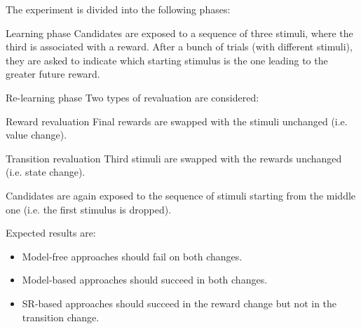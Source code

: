 \begin{casestudy}
    The experiment is divided into the following phases:
    \begin{descriptionlist}
        \item[Learning phase] 
            Candidates are exposed to a sequence of three stimuli, where the third is associated with a reward.
            After a bunch of trials (with different stimuli), they are asked to indicate which starting stimulus is the one leading to the greater future reward.

        \item[Re-learning phase]
            Two types of revaluation are considered:
            \begin{descriptionlist}
                \item[Reward revaluation] 
                    Final rewards are swapped with the stimuli unchanged (i.e. value change).
                \item[Transition revaluation] 
                    Third stimuli are swapped with the rewards unchanged (i.e. state change). 
            \end{descriptionlist}
            Candidates are again exposed to the sequence of stimuli starting from the middle one (i.e. the first stimulus is dropped).
            
            Expected results are:
            \begin{itemize}
                \item Model-free approaches should fail on both changes.
                \item Model-based approaches should succeed in both changes.
                \item SR-based approaches should succeed in the reward change but not in the transition change.
            \end{itemize}
    \end{descriptionlist}


\end{casestudy}
